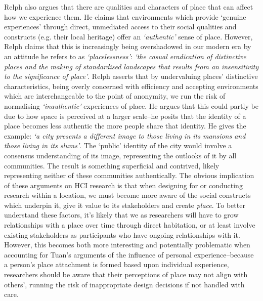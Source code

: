 Relph also argues that there are qualities and characters of place that can affect how we experience them. He claims that environments which provide `genuine experiences' through direct, unmediated access to their social qualities and constructs (e.g. their local heritage) offer an \textit{`authentic'} sense of place. However, Relph claims that this is increasingly being overshadowed in our modern era by an attitude he refers to as \textit{`placelessness'}: \textit{`the casual eradication of distinctive places and the making of standardised landscapes that results from an insensitivity to the significance of place'}. Relph asserts that by undervaluing places' distinctive characteristics, being overly concerned with efficiency and accepting environments which are interchangeable to the point of anonymity, we run the risk of normalising \textit{`inauthentic'} experiences of place. He argues that this could partly be due to how space is perceived at a larger scale--he posits that the identity of a place becomes less authentic the more people share that identity. He gives the example: \textit{`a city presents a different image to those living in its mansions and those living in its slums'}. The `public' identity of the city would involve a consensus understanding of its image, representing the outlooks of it by all communities. The result is something superficial and contrived, likely representing neither of these communities authentically.  The obvious implication of these arguments on HCI research is that when designing for or conducting research within a location, we must become more aware of the social constructs which underpin it, give it value to its stakeholders and create \textit{place}. To better understand these factors, it's likely that we as researchers will have to grow relationships with a place over time through direct habitation, or at least involve existing stakeholders as participants who have ongoing relationships with it. However, this becomes both more interesting and potentially problematic when accounting for Tuan's arguments of the influence of personal experience--because a person's place attachment is formed based upon individual experience, researchers should be aware that their perceptions of place may not align with others', running the risk of inappropriate design decisions if not handled with care. 

